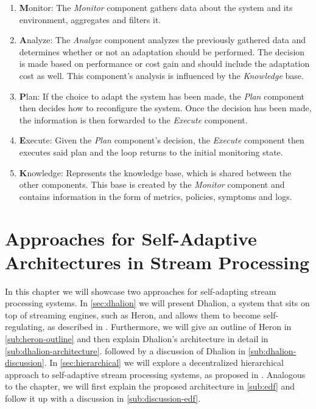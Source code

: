     \begin{enumerate}
    \label{enum:mape}
        \item \textbf{M}onitor: 
            The \textit{Monitor} component gathers data about the system and its environment, aggregates and filters it.
        \item \textbf{A}nalyze: 
            The \textit{Analyze} component analyzes the previously gathered data and determines whether or not an adaptation should be performed.
            The decision is made based on performance or cost gain and should include the adaptation cost as well.
            This component's analysis is influenced by the \textit{Knowledge} base.
        \item \textbf{P}lan: 
            If the choice to adapt the system has been made, the \textit{Plan} component then decides how to reconfigure the system.
            Once the decision has been made, the information is then forwarded to the \textit{Execute} component.
        \item \textbf{E}xecute: 
            Given the \textit{Plan} component's decision, the \textit{Execute} component then executes said plan and the loop 
            returns to the initial monitoring state.
        \item \textbf{K}nowledge: 
            Represents the knowledge base, which is shared between the other components.
            This base is created by the \textit{Monitor} component and contains information in the form of metrics, policies, symptoms and logs.
    \end{enumerate}
   


\chapter{Approaches for Self-Adaptive Architectures in Stream Processing}
\label{cha:approaches}
In this chapter we will showcase two approaches for self-adapting stream processing systems.
In \ref{sec:dhalion} we will present Dhalion, a system that sits on top of streaming engines, such as Heron, and allows them to become self-regulating, as described in \cite{dhalion}.
Furthermore, we will give an outline of Heron in \ref{sub:heron-outline} and then explain Dhalion's architecture in detail in \ref{sub:dhalion-architecture}. followed by a discussion of Dhalion in \ref{sub:dhalion-discussion}.
In \ref{sec:hierarchical} we will explore a decentralized hierarchical approach to self-adaptive stream processing systems, as proposed in \cite{cardellini}. Analogous to the  chapter, we will first 
explain the proposed architecture in \ref{sub:edf} and follow it up with a discussion in \ref{sub:discussion-edf}.

